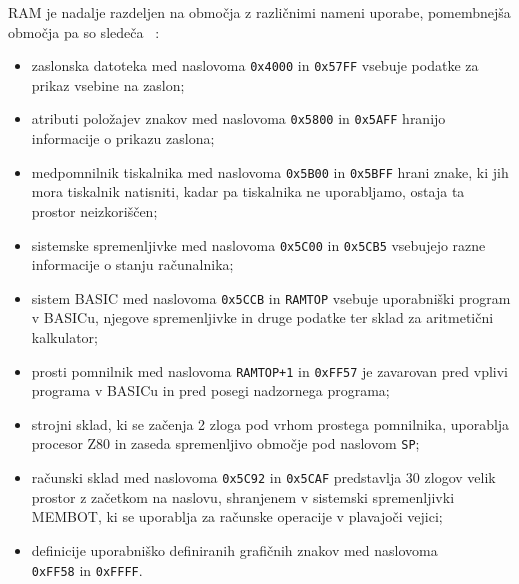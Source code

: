 \documentclass[a4paper, 12pt, openright]{book}
\begin{document}
    RAM je nadalje razdeljen na območja z različnimi nameni uporabe, pomembnejša območja
    pa so sledeča ~\cite{strojnijezikzaprocesorz80, zxspectrumbasicprogramming}:
    \begin{itemize}
        \item zaslonska datoteka med naslovoma \texttt{0x4000} in \texttt{0x57FF}
            vsebuje podatke za prikaz vsebine na zaslon;

        \item atributi položajev znakov med naslovoma \texttt{0x5800} in \texttt{0x5AFF}
            hranijo informacije o prikazu zaslona;

        \item medpomnilnik tiskalnika med naslovoma \texttt{0x5B00} in \texttt{0x5BFF}
            hrani znake, ki jih mora tiskalnik natisniti, kadar pa tiskalnika ne uporabljamo,
            ostaja ta prostor neizkoriščen;

        \item sistemske spremenljivke med naslovoma \texttt{0x5C00} in \texttt{0x5CB5}
            vsebujejo razne informacije o stanju računalnika;

        \item sistem BASIC med naslovoma \texttt{0x5CCB} in \texttt{RAMTOP} vsebuje
            uporabniški program v BASICu, njegove spremenljivke in druge podatke
            ter sklad za aritmetični kalkulator;

        \item prosti pomnilnik med naslovoma \texttt{RAMTOP+1} in \texttt{0xFF57}
            je zavarovan pred vplivi programa v BASICu in pred posegi nadzornega programa;

        \item strojni sklad, ki se začenja 2 zloga pod vrhom prostega pomnilnika,
            uporablja procesor Z80 in zaseda spremenljivo območje pod naslovom \texttt{SP};

        \item računski sklad med naslovoma \texttt{0x5C92} in \texttt{0x5CAF} predstavlja
            30 zlogov velik prostor z začetkom na naslovu, shranjenem v
            sistemski spremenljivki MEMBOT, ki se uporablja za računske operacije
            v plavajoči vejici;

        \item definicije uporabniško definiranih grafičnih znakov med naslovoma\\
            \texttt{0xFF58} in \texttt{0xFFFF}.
    \end{itemize}
\end{document}
